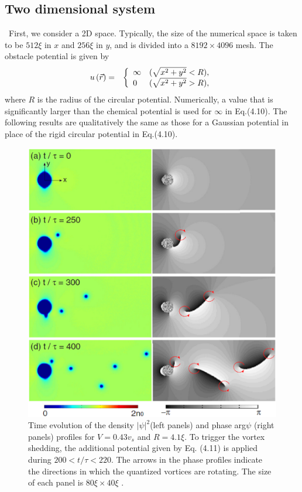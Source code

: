 \documentclass[12pt,a4paper]{report} %
\begin{document}
\subsection{Two dimensional system}
\ First, we consider a 2D space. Typically, the size of
the numerical space is taken to be $512 \xi$ in $x$ and $256 \xi$ in
$y$, and is divided into a $8192 \times 4096$ mesh. The obstacle
potential is given by
\begin{eqnarray}
u \left( \vec{r} \right) & = &
\left \{
\begin{array}{l l}
\infty & ( \sqrt{x^2+y^2} < R ),
\\
     0 & ( \sqrt{x^2+y^2} > R ),
\end{array}
\right.
\end{eqnarray}
where $R$ is the radius of the circular potential.
Numerically, a value that is significantly larger than the chemical
potential is used for $\infty$ in Eq.(4.10). The following results
are qualitatively the same as those for a Gaussian potential in place
of the rigid circular potential in Eq.(4.10).
\\
\begin{figure}[htbp]
\begin{center}
\includegraphics[scale=0.40, keepaspectratio]{4-1.eps}
\caption{
Time evolution of the density $|\psi|^2$(left
panels) and phase arg$\psi$ (right panels) profiles for $V = 0.43 v_s$ and
$R=4.1 \xi$. To trigger the vortex shedding, the additional potential
given by Eq. (4.11) is applied during $200 < t/\tau < 220$. The arrows
in the phase profiles indicate the directions in which the quantized
vortices are rotating. The size of each panel is $80 \xi \times 40 \xi$ .
}
\label{FIG:4-1}
\end{center}
\end{figure}
\end{document}
